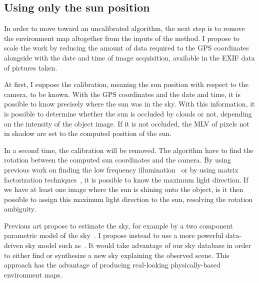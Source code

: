 


\subsection{Using only the sun position}
\label{subsec:knowingsunposition}

In order to move toward an uncalibrated algorithm, the next step is to remove the environment map altogether from the inputs of the method. I propose to scale the work by reducing the amount of data required to the GPS coordinates alongside with the date and time of image acquisition, available in the EXIF data of pictures taken.

At first, I suppose the calibration, meaning the sun position with respect to the camera, to be known. With the GPS coordinates and the date and time, it is possible to know precisely where the sun was in the sky. With this information, it is possible to determine whether the sun is occluded by clouds or not, depending on the intensity of the object image. If it is not occluded, the MLV of pixels not in shadow are set to the computed position of the sun.

In a second time, the calibration will be removed. The algorithm have to find the rotation between the computed sun coordinates and the camera. By using previous work on finding the low frequency illumination~\cite{basri-ijcv-2007} or by using matrix factorization techniques~\cite{shi-cvpr-10}, it is possible to know the maximum light direction. If we have at least one image where the sun is shining onto the object, is it then possible to assign this maximum light direction to the sun, resolving the rotation ambiguity.

Previous art propose to estimate the sky, for example by a two component parametric model of the sky~\cite{jung-cvpr-15}. I propose instead to use a more powerful data-driven sky model such as~\cite{lalonde-3dv-14}. It would take advantage of our sky database in order to either find or synthesize a new sky explaining the observed scene. This approach has the advantage of producing real-looking physically-based environment maps.

